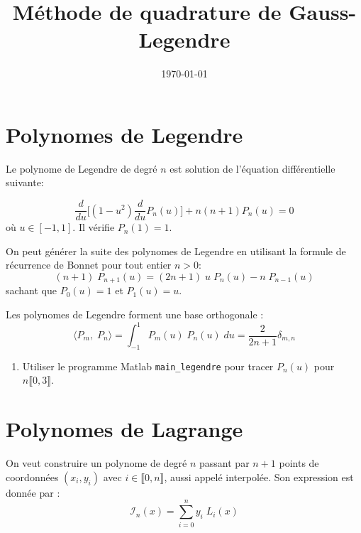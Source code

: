 \documentclass[a4paper, 10pt]{article}
\begin{document}
\title{Méthode de quadrature de Gauss-Legendre}

\date{\today}
 
\maketitle

\section{Polynomes de Legendre}

Le polynome de Legendre de degré $n$ est solution de l'équation différentielle suivante:

\begin{equation}
\frac{d}{du} \big[(1-u^2) \frac{d}{du} P_n(u) \big]+n(n+1) P_n(u)=0
\label{eqdif_legendre}
\end{equation}
où $u \in [-1, 1]$. Il vérifie $P_n(1)=1$.

On peut générer la suite des polynomes de Legendre en utilisant la formule de récurrence de Bonnet
pour tout entier $n>0$:
\begin{equation}
(n+1) \; P_{n+1}(u) = (2n+1)\; u \; P_n(u) -n \; P_{n-1}(u)
\label{recurrence}
\end{equation}
sachant que $P_0(u)=1$ et $P_1(u)=u$.

Les  polynomes de Legendre forment une base orthogonale :
\begin{equation}
\langle P_m, \; P_n \rangle=\int_{-1}^{1} P_m(u) \; P_n(u)\; du = \frac{2}{2n+1}\delta_{m,n}
\label{ortho}
\end{equation}

\begin{enumerate}
\item Utiliser le programme Matlab {\tt main\_legendre} pour tracer $P_n(u)$ pour  $n  \llbracket  0, 3  \rrbracket$.
\end{enumerate}

\section{Polynomes de Lagrange}

On veut construire un polynome de degré $n$ passant par $n+1$ points de coordonnées $(x_i, y_i)$ avec $i \in  \llbracket  0, n  \rrbracket $,
aussi appelé interpolée. Son expression est donnée par :
\begin{equation}
\mathscr{I}_n(x)= \sum_{i=0}^n y_i \; L_i(x)
\label{interpolee}
\end{equation}
\end{document}
